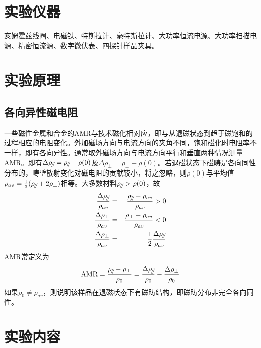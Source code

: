\documentclass[a4paper]{article}
\newcommand{\parallelsum}{\mathbin{\!/\mkern-5mu/\!}}
\begin{document}
\section{实验仪器}
亥姆霍兹线圈、电磁铁、特斯拉计、毫特斯拉计、大功率恒流电源、大功率扫描电源、精密恒流源、数字微伏表、四探针样品夹具。

\section{实验原理}
\subsection{各向异性磁电阻}
一些磁性金属和合金的AMR与技术磁化相对应，即与从退磁状态到趋于磁饱和的过程相应的电阻变化。外加磁场方向与电流方向的夹角不同，饱和磁化时电阻率不一样，即有各向异性。通常取外磁场方向与电流方向平行和垂直两种情况测量AMR。即有$\Delta\rho_{\it{\parallelsum}} = \rho_{\parallelsum} - \rho(0)$及$\Delta\rho_{\perp} = \rho_{\perp} - \rho(0)$。若退磁状态下磁畴是各向同性分布的，畴壁散射变化对磁电阻的贡献较小，将之忽略，则$\rho(0)$与平均值$\rho_{av} = \frac{1}{3}(\rho_{\parallelsum} + 2\rho_{\perp})$相等。大多数材料$\rho_{\parallelsum} > \rho(0)$，故
\begin{eqnarray*}
	\frac{\Delta\rho_{\parallelsum}}{\rho_{av}} &=& \frac{\rho_{\parallelsum} - \rho_{av}}{\rho_{av}} > 0\\
	\frac{\Delta\rho_{\perp}}{\rho_{av}} &=& \frac{\rho_{\perp} - \rho_{av}}{\rho_{av}} < 0\\
	\frac{\Delta\rho_{\perp}}{\rho_{av}} &=& \frac{1}{2}\frac{\Delta\rho_{\parallelsum}}{\rho_{av}}
\end{eqnarray*}
AMR常定义为
\begin{equation*}
	\text{AMR} = \frac{\rho_{\parallelsum} - \rho_{\perp}}{\rho_0} = \frac{\Delta\rho_{\parallelsum}}{\rho_0} - \frac{\Delta\rho_{\perp}}{\rho_0}
\end{equation*}
如果$\rho_0\neq \rho_{av}$，则说明该样品在退磁状态下有磁畴结构，即磁畴分布非完全各向同性。%

\section{实验内容}
\end{document}
